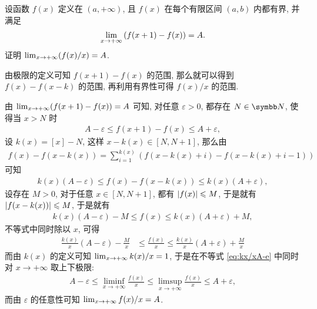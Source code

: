 \begin{exercise}[series=exer]
  \item 设函数 $ f(x) $ 定义在 $ (a, +\infty) $, 且 $ f(x) $ 在每个有限区间 $ (a, b) $ 内都有界, 并满足
  \begin{align*}
      \lim_{x \to +\infty} \qty(f(x + 1) - f(x)) = A.
  \end{align*}
  证明 $ \lim_{x \to +\infty} (f(x) / x) = A $.
  \begin{hint}
      由极限的定义可知 $ f(x + 1) - f(x) $ 的范围, 那么就可以得到 $ f(x) - f(x - k) $ 的范围, 再利用有界性可得 $ f(x)/x $ 的范围.
  \end{hint}
  \begin{answer}
      由 $ \lim_{x \to +\infty} (f(x + 1) - f(x)) = A $ 可知, 对任意 $ \varepsilon > 0 $, 都存在 $ N \in \N $, 使得当 $ x > N $ 时
      \begin{align*}
          A - \varepsilon \le f(x + 1) - f(x) \le A + \varepsilon,
      \end{align*}
      设 $ k(x) = [x] - N $, 这样 $ x - k(x) \in [N, N + 1] $, 那么由
      \begin{align*}
          f(x) - f(x - k(x)) = \sum_{i = 1}^{k(x)}(f(x - k(x) + i) - f(x - k(x) + i - 1))
      \end{align*}
      可知
      \begin{align*}
          k(x)(A - \varepsilon) \le f(x) - f(x - k(x)) \le k(x)(A + \varepsilon),
      \end{align*}
      设存在 $ M > 0 $, 对于任意 $ x \in [N, N + 1] $, 都有 $ \abs{f(x)} \leqslant M $, 于是就有 $ \abs{f(x - k(x))} \leqslant M $, 于是就有
      \begin{align*}
          k(x)(A - \varepsilon) - M \le f(x) \le k(x)(A + \varepsilon) + M,
      \end{align*}
      不等式中同时除以 $ x $, 可得
      \begin{align}\label{eq:kx/xA-e}
          \frac{k(x)}{x}(A - \varepsilon) - \frac{M}{x} & \le \frac{f(x)}{x} \le \frac{k(x)}{x}(A + \varepsilon) + \frac{M}{x}
      \end{align}
      而由 $ k(x) $ 的定义可知 $ \lim_{x \to +\infty}k(x)/x = 1 $, 于是在不等式 \eqref{eq:kx/xA-e} 中同时对 $ x \to +\infty $ 取上下极限:
      \begin{align*}
          A - \varepsilon \le \liminf_{x \to +\infty} \frac{f(x)}{x} \le \limsup_{x \to +\infty} \frac{f(x)}{x} \le A + \varepsilon,
      \end{align*}
      而由 $ \varepsilon $ 的任意性可知 $ \lim_{x \to +\infty} f(x)/x = A $.
  \end{answer}

\end{exercise}
